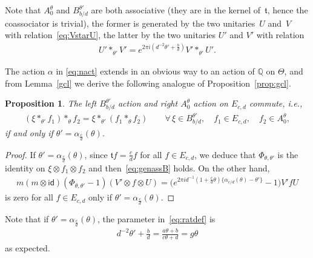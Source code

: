 \documentclass[pdftex]{sigma}
\numberwithin{equation}{section}
\newtheorem{prop}[thm]{Proposition}
\theoremstyle{definition}
\newcommand{\Q}{\mathbb{Q}}
\newcommand{\id}{\mathsf{id}}
\newcommand{\mf}{\mathfrak}
\newcommand{\gc}{\mf{t}}
\begin{document}
Note that $A_0^\theta$ and $B_{b/d}^{\theta'}$ are both associative (they are in the kernel of~$\gc$, hence the coassociator is trivial), the former is generated by the two unitaries~$U$ and~$V$ with relation~\eqref{eq:VstarU}, the latter by the two unitaries $U'$ and $V'$ with relation
\begin{gather}\label{eq:ratdef}
U'\ast_{\theta'}V'=e^{2\pi i(d^{-2}\theta'+\frac{b}{d})}V'\ast_{\theta'}U' .
\end{gather}

The action $\alpha$ in \eqref{eq:nact} extends in an obvious way to an action of $\Q$ on $\Theta$, and from Lemma~\ref{gcl} we derive the following analogue of Proposition~\ref{prop:gcl}.

\begin{prop}
The left $B_{b/d}^{\theta'}$ action and right $A_0^\theta$ action
on $E_{c,d}$ commute, i.e.,
\begin{gather}\label{eq:genassB}
(\xi\ast_{\theta'}f_1)\ast_\theta f_2=
\xi\ast_{\theta'}(f_1\ast_\theta f_2)
\qquad \forall\,\xi\in B_{b/d}^{\theta'},\quad f_1\in E_{c,d},\quad f_2\in A_0^\theta ,
\end{gather}
if and only if $\theta'=\alpha_{\frac{c}{d}}(\theta)$.
\end{prop}

\begin{proof}
If $\theta'=\alpha_{\frac{c}{d}}(\theta)$,
since $\gc f=\frac{c}{d}f$ for all $f\in E_{c,d}$, we deduce that $\Phi_{\theta,\theta'}$ is the identity on $\xi\otimes f_1\otimes f_2$ and then~\eqref{eq:genassB} holds. On the other hand,
\begin{gather*}
m(m\otimes\id)(\Phi_{\theta,\theta'}-1)(V'\otimes f\otimes U)
=\big(e^{2\pi id^{-1}(1+\frac{c}{d}\theta)
\{\alpha_{c/d}(\theta)-\theta'\}}-1\big)V'fU
\end{gather*}
is zero for all $f\in E_{c,d}$ only if $\theta'=\alpha_{\frac{c}{d}}(\theta)$.
\end{proof}

Note that if $\theta'=\alpha_{\frac{c}{d}}(\theta)$, the parameter in~\eqref{eq:ratdef} is
\begin{gather*}
d^{-2}\theta'+\frac{b}{d}=\frac{a\theta+b}{c\theta+d}=g\theta
\end{gather*}
as expected.
\end{document}
